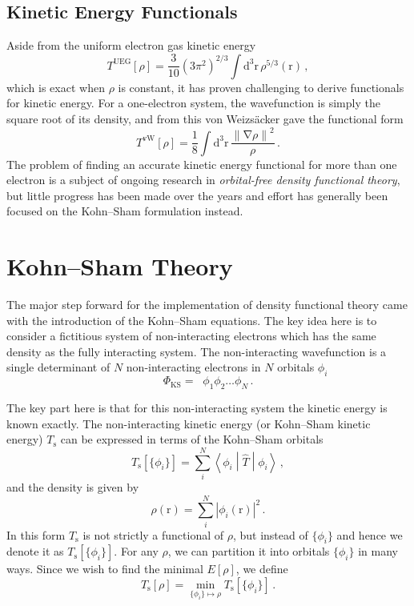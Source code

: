 \documentclass{article}
\theoremstyle{plain}\theoremheaderfont{\normalfont\itshape}\theorembodyfont{\rmfamily}\theoremseparator{.}\newtheorem*{rem}{Remark}\newtheorem*{ex}{Example}\newtheorem*{proof}{Proof}\newtheorem*{altp}{Alternative proof}
\theoremstyle{plain}\theoremheaderfont{\normalfont\bfseries}\theorembodyfont{\rmfamily}\theoremseparator{.}\newtheorem{thm}{Theorem}[section]\newtheorem{lem}[thm]{Lemma}\newtheorem{prop}[thm]{Proposition}\newtheorem*{cor}{Corollary}\newtheorem{defn}[thm]{Definition}\newtheorem{clm}[thm]{Claim}\newtheorem{clminproof}{Claim}
\theoremstyle{break}\theoremheaderfont{\normalfont\itshape}\theorembodyfont{\rmfamily}\theoremseparator{.\medskip}\newtheorem*{proofskip}{Proof}\newtheorem*{exs}{Examples}\newtheorem*{rems}{Remarks}
\theoremstyle{break}\theoremheaderfont{\normalfont\bfseries}\theorembodyfont{\rmfamily}\theoremseparator{.\medskip}\newtheorem{lemskip}[thm]{Lemma}\newtheorem{defnskip}[thm]{Definition}\newtheorem{propskip}[thm]{Proposition}\newtheorem{thmskip}[thm]{Theorem}
\numberwithin{equation}{section}
\newcommand{\dd}[2][]{\mathrm{d}^{#1} #2\,}
\newcommand{\expval}[2]{\left\langle #2 \middle| #1 \middle| #2 \right\rangle}
\newcommand{\vb}[1]{\bm{\mathrm{#1}}}
\newcommand{\abs}[1]{\left| #1 \right|}
\newcommand{\norm}[1]{\left\| #1 \right\|}
\newcommand{\grad}{\vb{\nabla}}
\DeclareMathOperator{\antisymm}{\hat{\mathcal{A}}}
\newcommand{\s}{_{\text{s}}}
\begin{document}
    \subsection{Kinetic Energy Functionals}
    Aside from the uniform electron gas kinetic energy
    \begin{equation}
        T^{\text{UEG}}[\rho]=\frac{3}{10}(3\pi^2)^{2/3}\int\dd[3]{\vb{r}}\rho^{5/3}(\vb{r})\,,
    \end{equation}
    which is exact when \(\rho\) is constant, it has proven challenging to derive functionals for kinetic energy. For a one-electron system, the wavefunction is simply the square root of its density, and from this von Weizs\"{a}cker gave the functional form
    \begin{equation}
        T^{\text{vW}}[\rho]=\frac{1}{8}\int\dd[3]{\vb{r}}\frac{\norm{\grad\rho}^2}{\rho}\,.
    \end{equation}
    The problem of finding an accurate kinetic energy functional for more than one electron is a subject of ongoing research in \textit{orbital-free density functional theory}, but little progress has been made over the years and effort has generally been focused on the Kohn--Sham formulation instead.

    \newpage
    \section{Kohn--Sham Theory}
    The major step forward for the implementation of density functional theory came with the introduction of the Kohn--Sham equations. The key idea here is to consider a fictitious system of non-interacting electrons which has the same density as the fully interacting system. The non-interacting wavefunction is a single determinant of \(N\) non-interacting electrons in \(N\) orbitals \(\phi_i\)
    \begin{equation}
        \Phi_{\text{KS}}=\antisymm\phi_1\phi_2\dots\phi_N\,.
    \end{equation}

    The key part here is that for this non-interacting system the kinetic energy is known exactly. The non-interacting kinetic energy (or Kohn--Sham kinetic energy) \(T\s\) can be expressed in terms of the Kohn--Sham orbitals
    \begin{equation}
        T\s[\{\phi_i\}]=\sum_{i}^{N}\expval{\hat{T}}{\phi_i}\,,
    \end{equation}
    and the density is given by
    \begin{equation}
        \rho(\vb{r})=\sum_{i}^{N}\abs{\phi_i(\vb{r})}^2\,.
    \end{equation}
    In this form \(T\s\) is not strictly a functional of \(\rho\), but instead of \(\{\phi_i\}\) and hence we denote it as \(T\s[\{\phi_i\}]\). For any \(\rho\), we can partition it into orbitals \(\{\phi_i\}\) in many ways. Since we wish to find the minimal \(E[\rho]\), we define
    \begin{equation}
        T\s[\rho]=\min_{\{\phi_i\}\mapsto\rho}T\s[\{\phi_i\}]\,.
    \end{equation}
\end{document}
